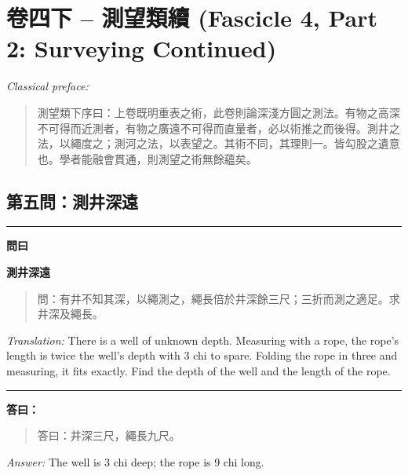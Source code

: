 \documentclass[11pt,a4paper]{article}
\newenvironment{problem}[1][]{%
  \medskip\noindent\rule{\textwidth}{0.4pt}%
  \par\noindent\textbf{\color{sectioncolor}#1}\par\nopagebreak%
  \smallskip%
}{%
  \par\noindent\rule{\textwidth}{0.4pt}\medskip%
}
\newenvironment{answer}{%
  \medskip\noindent{\color{answercolor}\rule{0.5\textwidth}{0.5pt}}%
  \par\color{answercolor}%
}{%
  \par\medskip%
}
\begin{document}
\newpage

\section{卷四下 -- 測望類續 (Fascicle 4, Part 2: Surveying Continued)}
\label{sec:juan4xia}

\noindent\textit{Classical preface:}
\begin{quote}
\textcolor{chinacolor}{%
測望類下序曰：上卷既明重表之術，此卷則論深淺方圓之測法。有物之高深不可得而近測者，有物之廣遠不可得而直量者，必以術推之而後得。測井之法，以繩度之；測河之法，以表望之。其術不同，其理則一。皆勾股之遺意也。學者能融會貫通，則測望之術無餘蘊矣。
}
\end{quote}

\subsection*{第五問：測井深遠}

\begin{problem}[\textbf{問曰}]
\textbf{\color{sectioncolor}測井深遠}

\begin{quote}
\textcolor{chinacolor}{%
問：有井不知其深，以繩測之，繩長倍於井深餘三尺；三折而測之適足。求井深及繩長。
}
\end{quote}

\textit{Translation:} There is a well of unknown depth. Measuring with a 
rope, the rope's length is twice the well's depth with 3 chi to spare. 
Folding the rope in three and measuring, it fits exactly. Find the depth 
of the well and the length of the rope.
\end{problem}

\begin{answer}
\textbf{答曰：}

\begin{quote}
\textcolor{chinacolor}{%
答曰：井深三尺，繩長九尺。
}
\end{quote}

\textit{Answer:} The well is 3 chi deep; the rope is 9 chi long.
\end{answer}
\end{document}
